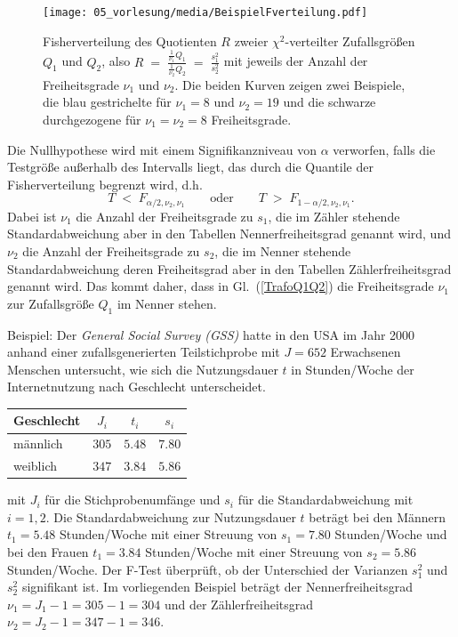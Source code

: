 \begin{figure}
\begin{center}
\texttt{[image: 05\_vorlesung/media/BeispielFverteilung.pdf]}
\caption{\label{Fverteilbeispiel}Fisherverteilung des Quotienten $R$
zweier $\chi^2$-verteilter Zufallsgrößen $Q_1$ und $Q_2$, also
$R \; = \; \frac{\frac{1}{\nu_1} Q_1}{\frac{1}{\nu_2} Q_2} \;
= \; \frac{s_1^2}{s_2^2}$ mit jeweils der Anzahl der Freiheitsgrade
$\nu_1$ und $\nu_2$. Die beiden Kurven zeigen zwei Beispiele, die
blau gestrichelte für $\nu_1 = 8$ und $\nu_2 = 19$ und die schwarze durchgezogene
für $\nu_1 = \nu_2 = 8$ Freiheitsgrade.}
\end{center}
\end{figure}



Die Nullhypothese wird mit einem Signifikanzniveau von $\alpha$
verworfen, falls die Testgröße außerhalb des Intervalls liegt,
das durch die Quantile der Fisherverteilung begrenzt wird, d.h.
\begin{equation}
T \; < \; F_{\alpha/2, \nu_2, \nu_1}  \qquad \mathrm{oder} \qquad
T \; > \; F_{1-\alpha/2, \nu_2, \nu_1} .
\end{equation}
Dabei ist $\nu_1$ die Anzahl der Freiheitsgrade zu $s_1$, die
im Zähler stehende Standardabweichung
aber in den Tabellen Nennerfreiheitsgrad genannt wird, und $\nu_2$
die Anzahl der Freiheitsgrade zu $s_2$, die im Nenner stehende
Standardabweichung deren Freiheitsgrad
aber in den Tabellen Zählerfreiheitsgrad genannt wird. Das kommt
daher, dass in Gl.~(\ref{TrafoQ1Q2}) die Freiheitsgrade $\nu_1$ zur
Zufallsgröße $Q_1$ im Nenner stehen.

Beispiel:
Der \textsl{General Social Survey (GSS)} hatte in den USA im Jahr 2000 anhand einer
zufallsgenerierten Teilstichprobe mit $J = 652$ Erwachsenen Menschen untersucht,
wie sich die Nutzungsdauer $t$ in Stunden/Woche der Internetnutzung nach Geschlecht unterscheidet.

\begin{center}
\begin{tabular}{l|ccc}
Geschlecht & $J_i$ & $t_i$ & $s_i$\\
\hline\hline
männlich & $305$ & $5.48$ & $7.80$\\
\hline
weiblich & $347$ & $3.84$ & $5.86$
\end{tabular}
\end{center}

mit $J_i$ für die Stichprobenumfänge und $s_i$ für die Standardabweichung mit $i = 1,2$.
Die Standardabweichung zur Nutzungsdauer $t$ beträgt bei den Männern $t_1 = 5.48$  Stunden/Woche
mit einer Streuung von
$s_1 = 7.80$ Stunden/Woche und bei den Frauen
$t_1 = 3.84$  Stunden/Woche mit einer Streuung von $s_2 = 5.86$ Stunden/Woche.
Der F-Test überprüft, ob der Unterschied der Varianzen $s_1^2$ und $s_2^2$ signifikant ist.
Im vorliegenden Beispiel beträgt der Nennerfreiheitsgrad $\nu_1 = J_1 - 1 = 305-1 = 304$ und der
Zählerfreiheitsgrad $\nu_2 = J_2 - 1 = 347-1 = 346$.

